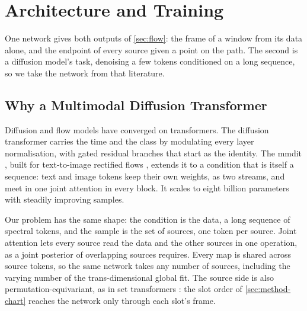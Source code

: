 \section{Architecture and Training}
\label{sec:architecture}

One network gives both outputs of \cref{sec:flow}: the frame of a window from its data alone, and
the endpoint of every source given a point on the path. The second is a diffusion model's task,
denoising a few tokens conditioned on a long sequence, so we take the network from that literature.

\subsection{Why a Multimodal Diffusion Transformer}
\label{sec:method-network}\label{sec:gw-tokens}

Diffusion and flow models \citep{sohl2015deep,ho2020denoising,song2021score,lipman2023flow} have
converged on transformers. The diffusion transformer \citep{peebles2023scalable} carries the time
and the class by modulating every layer normalisation, with gated residual branches that start as
the identity. The \ac{mmdit} \citep{esser2024scaling}, built for text-to-image rectified flows
\citep{liu2023flow}, extends it to a condition that is itself a sequence: text and image tokens
keep their own weights, as two streams, and meet in one joint attention in every block. It scales
to eight billion parameters with steadily improving samples.

Our problem has the same shape: the condition is the data, a long sequence of spectral tokens, and
the sample is the set of sources, one token per source. Joint attention lets every source read the
data and the other sources in one operation, as a joint posterior of overlapping sources requires.
Every map is shared across source tokens, so the same network takes any number of sources,
including the varying number of the trans-dimensional global fit. The source side is also
permutation-equivariant, as in set transformers \citep{zaheer2017deep,lee2019set}: the slot order
of \cref{sec:method-chart} reaches the network only through each slot's frame.

